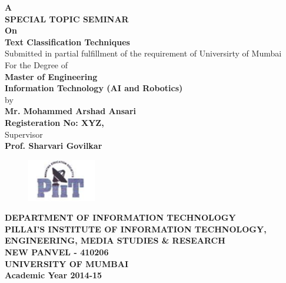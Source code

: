 \documentclass[12pt]{book}
\begin{document}
\thispagestyle{empty}

\begin{center}
	\fontsize{14}{30}\selectfont \textbf{A\\SPECIAL TOPIC SEMINAR\\ On}\\
  	\fontsize{20}{30}\selectfont \textbf{Text Classification Techniques}\\
  	\fontsize{14}{24}\selectfont Submitted in partial fulfillment of the requirement of Universirty of Mumbai\\For the Degree of\\
  	\fontsize{16}{30}\selectfont \textbf{Master of Engineering}\\
  	\fontsize{14}{30}\selectfont \textbf{Information Technology (AI and Robotics)} \\
  	by\\
  	\textbf{Mr. Mohammed Arshad Ansari}\\
  	\textbf{Registeration No: XYZ,}\\
  	Supervisor\\
  	\textbf{Prof. Sharvari Govilkar}\\
	\vspace{30mm}
	\begin{figure}[ht!]
	  \centering
	  \includegraphics[width=30mm]{piit.png}
	\end{figure}
  	\fontsize{14}{20}\selectfont \textbf{DEPARTMENT OF INFORMATION TECHNOLOGY\\PILLAI'S INSTITUTE OF INFORMATION TECHNOLOGY,\\
	ENGINEERING, MEDIA STUDIES \& RESEARCH\\ NEW PANVEL - 410206\\UNIVERSITY OF MUMBAI\\Academic Year 2014-15}

\end{center}
\end{document}
